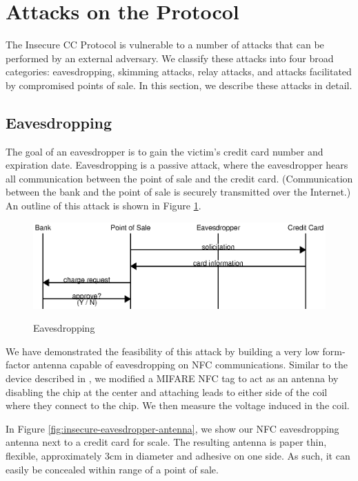\section{Attacks on the Protocol}
\label{sec:insecure-attacks}

The Insecure CC Protocol is vulnerable to a number of attacks that can be performed by an external adversary.
We classify these attacks into four broad categories:
    eavesdropping, skimming attacks, relay attacks, and attacks facilitated by compromised points of sale.
In this section, we describe these attacks in detail.


\subsection{Eavesdropping}
\label{sec:insecure-eavesdropper}
The goal of an eavesdropper is to gain the victim's credit card number and expiration date.
Eavesdropping is a passive attack, where the eavesdropper hears all communication between the point of sale and the credit card.
(Communication between the bank and the point of sale is securely transmitted over the Internet.)
An outline of this attack is shown in Figure \ref{fig:insecure-eavesdropper}.

\begin{figure}
  \caption{Eavesdropping}
  \centering
    \includegraphics{img/attack-3-eavesdrop.eps}
  \label{fig:insecure-eavesdropper}
\end{figure}

We have demonstrated the feasibility of this attack by building a very low form-factor antenna capable of eavesdropping on NFC communications.
Similar to the device described in \cite{kortvedt2009eavesdropping}, we modified a MIFARE NFC tag to act as an antenna by disabling the chip at the center and attaching leads to either side of the coil where they connect to the chip.
We then measure the voltage induced in the coil.

In Figure \ref{fig:insecure-eavesdropper-antenna}, we show our NFC eavesdropping antenna next to a credit card for scale.
The resulting antenna is paper thin, flexible, approximately 3cm in diameter and adhesive on one side.
As such, it can easily be concealed within range of a point of sale.

